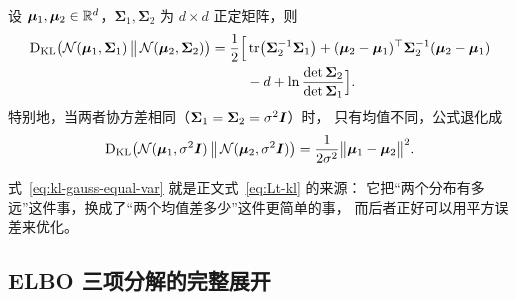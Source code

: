 \begin{proposition}
设 $\bm{\mu}_1,\bm{\mu}_2\in\mathbb{R}^d$，$\bm{\Sigma}_1,\bm{\Sigma}_2$ 为 $d\times d$ 正定矩阵，则
\begin{equation}
  \begin{aligned}
  \mathrm{D}_{\mathrm{KL}}\bigl(\mathcal{N}(\bm{\mu}_1,\bm{\Sigma}_1)\,\big\|\,\mathcal{N}(\bm{\mu}_2,\bm{\Sigma}_2)\bigr)
  =\frac{1}{2}\Bigl[&\operatorname{tr}\bigl(\bm{\Sigma}_2^{-1}\bm{\Sigma}_1\bigr)
   +(\bm{\mu}_2-\bm{\mu}_1)^{\top}\bm{\Sigma}_2^{-1}(\bm{\mu}_2-\bm{\mu}_1) \\
   &-d+\ln\frac{\det\bm{\Sigma}_2}{\det\bm{\Sigma}_1}\Bigr].
  \end{aligned}
  \label{eq:kl-gauss}
\end{equation}
特别地，当两者协方差相同（$\bm{\Sigma}_1=\bm{\Sigma}_2=\sigma^2\bm{I}$）时，
只有均值不同，公式退化成
\begin{equation}
  \mathrm{D}_{\mathrm{KL}}\bigl(\mathcal{N}(\bm{\mu}_1,\sigma^2\bm{I})\,\big\|\,\mathcal{N}(\bm{\mu}_2,\sigma^2\bm{I})\bigr)
  =\frac{1}{2\sigma^2}\bigl\|\bm{\mu}_1-\bm{\mu}_2\bigr\|^2 .
  \label{eq:kl-gauss-equal-var}
\end{equation}
\end{proposition}

式~\eqref{eq:kl-gauss-equal-var} 就是正文式~\eqref{eq:Lt-kl} 的来源：
它把“两个分布有多远”这件事，换成了“两个均值差多少”这件更简单的事，
而后者正好可以用平方误差来优化。

\subsection{ELBO 三项分解的完整展开}
\label{app:elbo}

